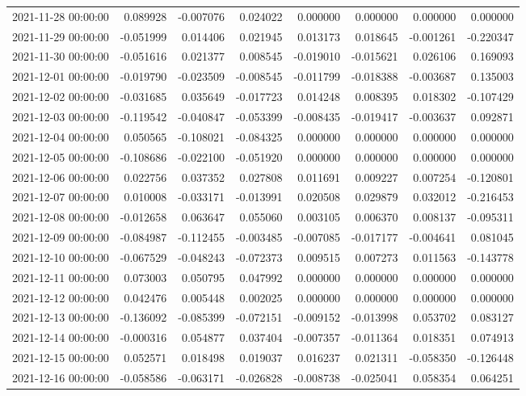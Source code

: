 \begin{tabular}{lrrrrrrr}
2021-11-28 00:00:00 & 0.089928 & -0.007076 & 0.024022 & 0.000000 & 0.000000 & 0.000000 & 0.000000 \\
2021-11-29 00:00:00 & -0.051999 & 0.014406 & 0.021945 & 0.013173 & 0.018645 & -0.001261 & -0.220347 \\
2021-11-30 00:00:00 & -0.051616 & 0.021377 & 0.008545 & -0.019010 & -0.015621 & 0.026106 & 0.169093 \\
2021-12-01 00:00:00 & -0.019790 & -0.023509 & -0.008545 & -0.011799 & -0.018388 & -0.003687 & 0.135003 \\
2021-12-02 00:00:00 & -0.031685 & 0.035649 & -0.017723 & 0.014248 & 0.008395 & 0.018302 & -0.107429 \\
2021-12-03 00:00:00 & -0.119542 & -0.040847 & -0.053399 & -0.008435 & -0.019417 & -0.003637 & 0.092871 \\
2021-12-04 00:00:00 & 0.050565 & -0.108021 & -0.084325 & 0.000000 & 0.000000 & 0.000000 & 0.000000 \\
2021-12-05 00:00:00 & -0.108686 & -0.022100 & -0.051920 & 0.000000 & 0.000000 & 0.000000 & 0.000000 \\
2021-12-06 00:00:00 & 0.022756 & 0.037352 & 0.027808 & 0.011691 & 0.009227 & 0.007254 & -0.120801 \\
2021-12-07 00:00:00 & 0.010008 & -0.033171 & -0.013991 & 0.020508 & 0.029879 & 0.032012 & -0.216453 \\
2021-12-08 00:00:00 & -0.012658 & 0.063647 & 0.055060 & 0.003105 & 0.006370 & 0.008137 & -0.095311 \\
2021-12-09 00:00:00 & -0.084987 & -0.112455 & -0.003485 & -0.007085 & -0.017177 & -0.004641 & 0.081045 \\
2021-12-10 00:00:00 & -0.067529 & -0.048243 & -0.072373 & 0.009515 & 0.007273 & 0.011563 & -0.143778 \\
2021-12-11 00:00:00 & 0.073003 & 0.050795 & 0.047992 & 0.000000 & 0.000000 & 0.000000 & 0.000000 \\
2021-12-12 00:00:00 & 0.042476 & 0.005448 & 0.002025 & 0.000000 & 0.000000 & 0.000000 & 0.000000 \\
2021-12-13 00:00:00 & -0.136092 & -0.085399 & -0.072151 & -0.009152 & -0.013998 & 0.053702 & 0.083127 \\
2021-12-14 00:00:00 & -0.000316 & 0.054877 & 0.037404 & -0.007357 & -0.011364 & 0.018351 & 0.074913 \\
2021-12-15 00:00:00 & 0.052571 & 0.018498 & 0.019037 & 0.016237 & 0.021311 & -0.058350 & -0.126448 \\
2021-12-16 00:00:00 & -0.058586 & -0.063171 & -0.026828 & -0.008738 & -0.025041 & 0.058354 & 0.064251 \\

\end{tabular}
